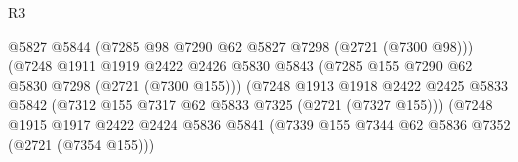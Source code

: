 \begin{lexlean}{R3}
\begin{coremodule}
                                              @5827
                                              @5844
                                              (@7285 @98 @7290 @62 @5827 @7298 (@2721 (@7300 @98)))
                                              (@7248
                                                @1911
                                                @1919
                                                @2422
                                                @2426
                                                @5830
                                                @5843
                                                (@7285
                                                  @155
                                                  @7290
                                                  @62
                                                  @5830
                                                  @7298
                                                  (@2721 (@7300 @155)))
                                                (@7248
                                                  @1913
                                                  @1918
                                                  @2422
                                                  @2425
                                                  @5833
                                                  @5842
                                                  (@7312
                                                    @155
                                                    @7317
                                                    @62
                                                    @5833
                                                    @7325
                                                    (@2721 (@7327 @155)))
                                                  (@7248
                                                    @1915
                                                    @1917
                                                    @2422
                                                    @2424
                                                    @5836
                                                    @5841
                                                    (@7339
                                                      @155
                                                      @7344
                                                      @62
                                                      @5836
                                                      @7352
                                                      (@2721 (@7354 @155)))

\end{coremodule}
\end{lexlean}

